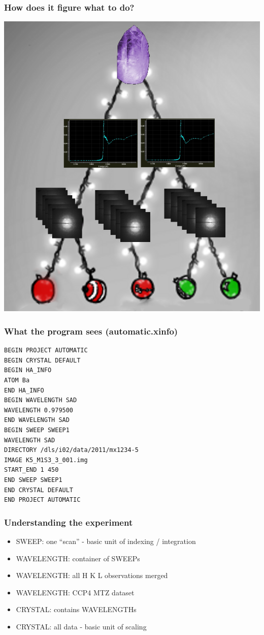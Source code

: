 \documentclass[slides,compress]{beamer}
\begin{document}
\begin{frame}
\frametitle{How does it figure what to do?}
\hspace{4cm}
\includegraphics[scale=0.25]{figures/christmas-tree-nothing-sweep.png}
\end{frame}

\begin{frame}[fragile]
\frametitle{What the program sees (automatic.xinfo)}
{\small
\begin{verbatim}
BEGIN PROJECT AUTOMATIC
BEGIN CRYSTAL DEFAULT
BEGIN HA_INFO
ATOM Ba
END HA_INFO
BEGIN WAVELENGTH SAD
WAVELENGTH 0.979500
END WAVELENGTH SAD
BEGIN SWEEP SWEEP1
WAVELENGTH SAD
DIRECTORY /dls/i02/data/2011/mx1234-5
IMAGE K5_M1S3_3_001.img
START_END 1 450
END SWEEP SWEEP1
END CRYSTAL DEFAULT
END PROJECT AUTOMATIC
\end{verbatim}
}
\end{frame}

\begin{frame}
\frametitle{Understanding the experiment}
\begin{itemize}
\item{SWEEP: one ``scan'' - basic unit of indexing / integration}
\item{WAVELENGTH: container of SWEEPs}
\item{WAVELENGTH: all H K L observations merged}
\item{WAVELENGTH: CCP4 MTZ dataset}
\item{CRYSTAL: contains WAVELENGTHs}
\item{CRYSTAL: all data - basic unit of scaling}
\end{itemize}
\end{frame}
\end{document}
